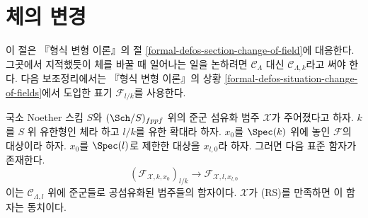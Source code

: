\section{체의 변경}
\label{section-change-of-field}

\noindent
이 절은 『형식 변형 이론』의 절
\ref{formal-defos-section-change-of-field}에 대응한다. 그곳에서 지적했듯이
체를 바꿀 때 일어나는 일을 논하려면 $\mathcal{C}_\Lambda$ 대신
$\mathcal{C}_{\Lambda, k}$라고 써야 한다. 다음 보조정리에서는
『형식 변형 이론』의 상황
\ref{formal-defos-situation-change-of-fields}에서 도입한 표기
$\mathcal{F}_{l/k}$를 사용한다.

\begin{lemma}
\label{lemma-change-of-field}
국소 Noether 스킴 $S$와 $(\Sch/S)_{fppf}$ 위의 준군 섬유화 범주
$\mathcal{X}$가 주어졌다고 하자. $k$를 $S$ 위 유한형인 체라 하고
$l/k$를 유한 확대라 하자.
$x_0$를 $\Spec(k)$ 위에 놓인 $\mathcal{F}$의 대상이라 하자.
$x_0$를 $\Spec(l)$로 제한한 대상을 $x_{l, 0}$라 하자. 그러면
다음 표준 함자가 존재한다.
$$
(\mathcal{F}_{\mathcal{X}, k , x_0})_{l/k}
\longrightarrow
\mathcal{F}_{\mathcal{X}, l, x_{l, 0}}
$$
이는 $\mathcal{C}_{\Lambda, l}$ 위에 준군들로 공섬유화된 범주들의
함자이다. $\mathcal{X}$가 (RS)를 만족하면 이 함자는 동치이다.
\end{lemma}

